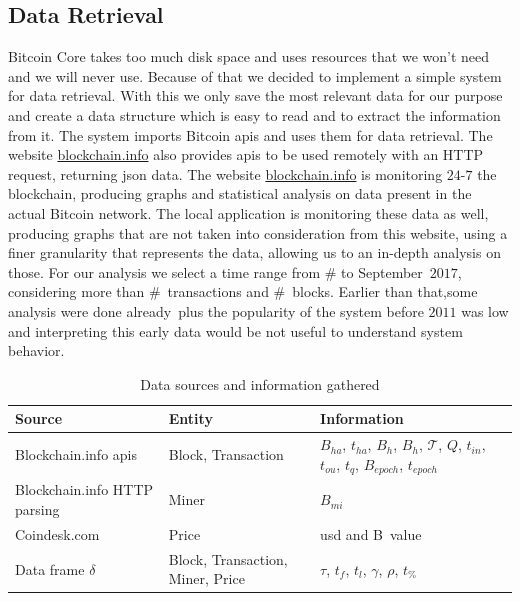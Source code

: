 \documentclass[USenglish]{uit-thesis}
\def\bitcoin{\leavevmode\rlap{\hskip.5pt-}B}
\begin{document}
\subsection{Data Retrieval}
\label{sec:dataretrieval}
Bitcoin Core takes too much disk space and uses resources
that we won't need and we will never use. Because of that we
decided to implement a simple system for data retrieval.
With this we only save the most relevant data
for our purpose and create a data structure which
is easy to read and to extract the information from it.
The system imports Bitcoin \gls{api}s and uses
them for data retrieval. The website \url{blockchain.info}
also provides \gls{api}s to be used remotely with an
HTTP request, returning \gls{json} data.
The website \url{blockchain.info} is monitoring $24$-$7$ the blockchain,
producing graphs and
statistical analysis on data present in the
actual Bitcoin network. The local
application is monitoring these data as well,
producing graphs that are not taken into
consideration from this website,
using a finer granularity that represents
the data, allowing us to an in-depth analysis
on those.
For our analysis we select a time range from \# to
September~$2017$, considering more than \#~transactions
and \#~blocks. Earlier than that,some analysis were
done already\,\cite{croman2016, RePEc:gat:wpaper:1407,
	Moser2015, Rizun:2015:blocksizelimit}
plus the popularity of the system before
$2011$ was low and interpreting this early data would
be not useful to understand system behavior.
\begin{table}
	\centering
		\caption{Data sources and information gathered}
		\label{tab:datasources}
	\begin{tabular}{|p{3cm}p{3cm}p{4cm}|} \hline
			\centering
			\textbf{Source}&\textbf{Entity}& \textbf{Information}\\
			\hline
			Blockchain.info \gls{api}s&Block, Transaction&$B_{ha}$, $t_{ha}$, $B_h$, $B_h$, $\mathcal{T}$, $Q$, $t_{in}$, $t_{ou}$, $t_q$, $B_{epoch}$, $t_{epoch}$\\
			\hline
			Blockchain.info HTTP parsing&Miner& $B_{mi}$\\
			\hline
			Coindesk.com&Price&\gls{usd} and \bitcoin~value\\
			\hline
			Data frame $\delta$&Block, Transaction, Miner, Price&$\tau$, $t_f$, $t_l$, $\gamma$, $\rho$, $t_\%$\\
			\hline
		\end{tabular}
\end{table}
\end{document}
